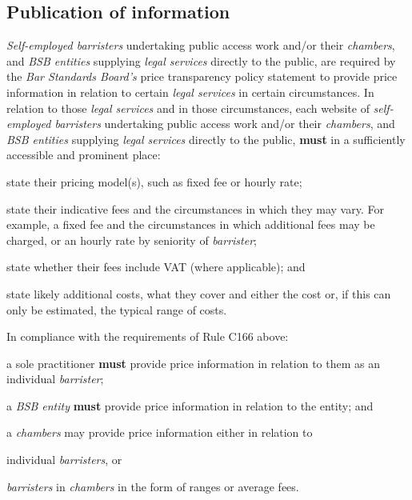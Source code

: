 \subsection{Publication of information}


\emph{Self-employed barristers} undertaking public access work and/or
their \emph{chambers}, and \emph{BSB entities} supplying \emph{legal
services} directly to the public, are required by the \emph{Bar
Standards Board's} price transparency policy statement to provide price
information in relation to certain \emph{legal services} in certain
circumstances. In relation to those \emph{legal services} and in those
circumstances, each website of \emph{self-employed barristers}
undertaking public access work and/or their \emph{chambers}, and
\emph{BSB entities} supplying \emph{legal services} directly to the
public, \textcolor{myred}{\textbf{must}} in a sufficiently accessible and prominent place:
\begin{numlist}\item state their pricing model(s), such as fixed fee or hourly rate;
\item state their indicative fees and the circumstances in which they may
vary. For example, a fixed fee and the circumstances in which additional
fees may be charged, or an hourly rate by seniority of \emph{barrister};
\item state whether their fees include VAT (where applicable); and
\item state likely additional costs, what they cover and either the cost
or, if this can only be estimated, the typical range of costs.
\end{numlist}

In compliance with the requirements of Rule C166 above:
\begin{numlist}\item a sole practitioner \textcolor{myred}{\textbf{must}} provide price information in relation to
them as an individual \emph{barrister};
\item a \emph{BSB entity} \textcolor{myred}{\textbf{must}} provide price information in relation to the
entity; and
\item a \emph{chambers} may provide price information either in relation to\begin{numlist}\item individual \emph{barristers}, or \item \emph{barristers} in
\emph{chambers} in the form of ranges or average fees.
\end{numlist}\end{numlist}


